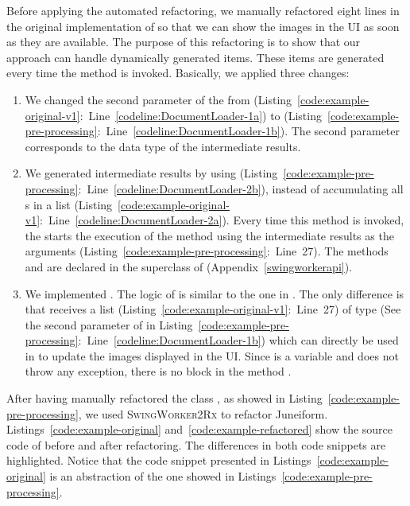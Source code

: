 \documentclass[type=bsc,accentcolor=tud9c]{tudthesis}
\newcommand{\toolextension}{\textsc{SwingWorker2Rx}}
\begin{document}
Before applying the automated refactoring, we manually refactored eight lines in the original implementation of  so that we can show the images in the UI as soon as they are available. The purpose of this refactoring is to show that our approach can handle dynamically generated items. These items are generated every time the method  is invoked. Basically, we applied three changes:
\begin{enumerate}
	\item We changed the second parameter of the  from  (Listing~\ref{code:example-original-v1}:~Line~\ref{codeline:DocumentLoader-1a}) to  (Listing~\ref{code:example-pre-processing}:~Line~\ref{codeline:DocumentLoader-1b}). The second parameter corresponds to the data type of the intermediate results. 
	\item We generated intermediate results by using  (Listing~\ref{code:example-pre-processing}:~Line~\ref{codeline:DocumentLoader-2b}), instead of accumulating all s in a list (Listing~\ref{code:example-original-v1}:~Line~\ref{codeline:DocumentLoader-2a}). Every time this method is invoked, the  starts the execution of the method  using the intermediate results as the arguments (Listing~\ref{code:example-pre-processing}:~Line~27). The methods  and  are declared in the superclass of  (Appendix~\ref{swingworkerapi}).
	\item We implemented . The logic of  is similar to the one in . The only difference is that  receives a list  (Listing~\ref{code:example-original-v1}:~Line~27) of type  (See the second parameter of  in Listing~\ref{code:example-pre-processing}:~Line~\ref{codeline:DocumentLoader-1b}) which can directly be used in  to update the images displayed in the UI. Since  is a variable and  does not throw any exception, there is no  block in the method .
\end{enumerate}



After having manually refactored the class , as showed in Listing~\ref{code:example-pre-processing}, we used \toolextension{} to refactor Juneiform. Listings~\ref{code:example-original} and~\ref{code:example-refactored} show the source code of  before and after refactoring. The differences in both code snippets are highlighted. Notice that the code snippet presented in Listings~\ref{code:example-original} is an abstraction of the one showed in Listings~\ref{code:example-pre-processing}.
\end{document}
